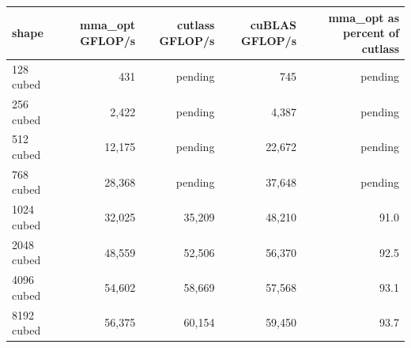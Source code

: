 \begin{tabular}{lrrrr}
\toprule
shape & mma\_opt GFLOP/s & cutlass GFLOP/s & cuBLAS GFLOP/s & mma\_opt as percent of cutlass \\
\midrule
128 cubed & 431 & pending & 745 & pending \\
256 cubed & 2,422 & pending & 4,387 & pending \\
512 cubed & 12,175 & pending & 22,672 & pending \\
768 cubed & 28,368 & pending & 37,648 & pending \\
1024 cubed & 32,025 & 35,209 & 48,210 & 91.0 \\
2048 cubed & 48,559 & 52,506 & 56,370 & 92.5 \\
4096 cubed & 54,602 & 58,669 & 57,568 & 93.1 \\
8192 cubed & 56,375 & 60,154 & 59,450 & 93.7 \\
\bottomrule
\end{tabular}

